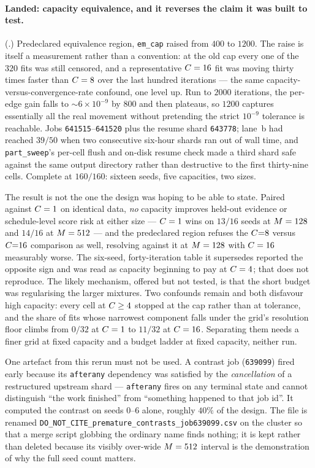 \paragraph{Landed: capacity equivalence, and it reverses the claim it was built
to test.}
      (.) Predeclared equivalence region,
\texttt{em\_cap} raised from $400$ to $1200$. The raise is itself a measurement rather than
a convention: at the old cap every one of the $320$ fits was still censored, and a
representative $C=16$ fit was moving thirty times faster than $C=8$ over the last
hundred iterations --- the same capacity-versus-convergence-rate confound, one level up. Run
to $2000$ iterations, the per-edge gain falls to ${\sim}6\times10^{-9}$ by $800$ and then
plateaus, so $1200$ captures essentially all the real movement without pretending the strict
$10^{-9}$ tolerance is reachable. Jobs \texttt{641515}--\texttt{641520} plus the resume shard
\texttt{643778}; lane~b had reached $39/50$ when two consecutive six-hour shards ran out of
wall time, and \texttt{part\_sweep}'s per-cell flush and on-disk resume check made a third
shard safe against the same output directory rather than destructive to the first
thirty-nine cells. Complete at $160/160$: sixteen seeds, five capacities, two sizes.

The result is not the one the design was hoping to be able to state. Paired against
$C=1$ on identical data, \emph{no} capacity improves held-out evidence or
schedule-level score risk at either size --- $C=1$ wins on $13/16$ seeds at
$M=128$ and $14/16$ at $M=512$ --- and the predeclared region refuses the
$C{=}8$ versus $C{=}16$ comparison as well, resolving against it at $M=128$
with $C=16$ measurably worse. The six-seed, forty-iteration table it supersedes
reported the opposite sign and was read as capacity beginning to pay at $C=4$; that
does not reproduce. The likely mechanism, offered but not tested, is that the short budget
was regularising the larger mixtures. Two confounds remain and both disfavour high capacity:
every cell at $C\geq4$ stopped at the cap rather than at tolerance, and the share of
fits whose narrowest component falls under the grid's resolution floor climbs from $0/32$ at
$C=1$ to $11/32$ at $C=16$. Separating them needs a finer grid at fixed capacity
and a budget ladder at fixed capacity, neither run.

One artefact from this rerun must not be used. A contrast job (\texttt{639099}) fired early
because its \texttt{afterany} dependency was satisfied by the \emph{cancellation} of a
restructured upstream shard --- \texttt{afterany} fires on any terminal state and cannot
distinguish ``the work finished'' from ``something happened to that job id''. It computed
the contrast on seeds $0$--$6$ alone, roughly $40\%$ of the design. The file is renamed
\texttt{DO\_NOT\_CITE\_premature\_contrasts\_job639099.csv} on the cluster so that a
merge script globbing the ordinary name finds nothing; it is kept rather than deleted
because its visibly over-wide $M=512$ interval is the demonstration of why the full seed
count matters.

